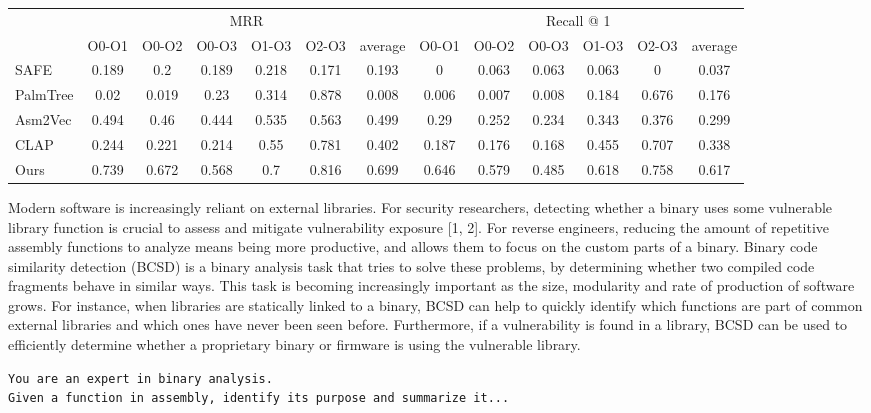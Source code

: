 \documentclass[conference,compsoc]{IEEEtran}
\begin{document}
\begin{table*}[!t]
\begin{tabular}{l|c|c|c|c|c|c|c|c|c|c|c|c|}
{\multirow{2}{*}{Models}} & \multicolumn{6}{c|}{MRR}                        & \multicolumn{6}{c|}{Recall @ 1}                 \\ \cline{2-13}
{}                        & O0-O1 & O0-O2 & O0-O3 & O1-O3 & O2-O3 & average & O0-O1 & O0-O2 & O0-O3 & O1-O3 & O2-O3 & average \\ \hline
{SAFE}                    & 0.189 & 0.2   & 0.189 & 0.218 & 0.171 & 0.193   & 0     & 0.063 & 0.063 & 0.063 & 0     & 0.037   \\
{PalmTree}                & 0.02  & 0.019 & 0.23  & 0.314 & 0.878 & 0.008   & 0.006 & 0.007 & 0.008 & 0.184 & 0.676 & 0.176   \\
{Asm2Vec}                 & 0.494 & 0.46  & 0.444 & 0.535 & 0.563 & 0.499   & 0.29  & 0.252 & 0.234 & 0.343 & 0.376 & 0.299   \\
{CLAP}                    & 0.244 & 0.221 & 0.214 & 0.55  & 0.781 & 0.402   & 0.187 & 0.176 & 0.168 & 0.455 & 0.707 & 0.338   \\ \hline
{Ours}                    & 0.739 & 0.672 & 0.568 & 0.7   & 0.816 & 0.699   & 0.646 & 0.579 & 0.485 & 0.618 & 0.758 & 0.617 
\end{tabular}
\end{table*}

Modern software is increasingly reliant on external libraries.
For security researchers, detecting whether a binary uses some vulnerable library function is crucial to assess
and mitigate vulnerability exposure [1, 2]. For reverse engineers, reducing the amount of repetitive assembly functions
to analyze means being more productive, and allows them to focus on the custom parts of a binary.  Binary code similarity
detection (BCSD) is a binary analysis task that tries to solve these problems, by determining whether two compiled
code fragments behave in similar ways. This task is becoming increasingly important as the size, modularity and rate of
production of software grows.  For instance, when libraries are statically linked to a binary, BCSD can help to
quickly identify which functions are part of common external libraries and which ones have never been seen before.
Furthermore, if a vulnerability is found in a library, BCSD can be used to efficiently determine whether a proprietary
binary or firmware is using the vulnerable library.

\begin{verbatim}
You are an expert in binary analysis.
Given a function in assembly, identify its purpose and summarize it...
\end{verbatim}
\end{document}
